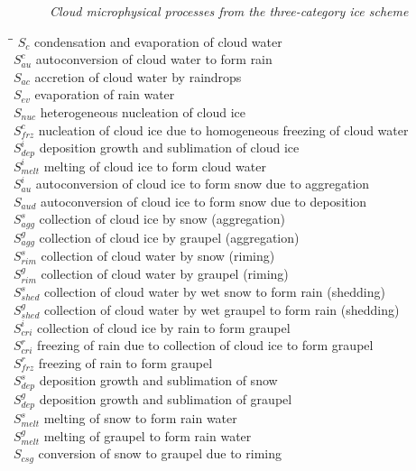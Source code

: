 \documentclass[a4paper,11pt]{article}
\begin{document}
\begin{figure}[h]
\centering
\epsfxsize 12.7cm
\centerline{}
\caption{\it Cloud microphysical processes from the three-category 
ice scheme} \label{scheme}
\end{figure}

\begin{tabbing}
\hspace*{0.5cm}\=\hspace{1.5cm}\= \kill
\> $S_c $ \> condensation and evaporation of cloud water\\
\> $S_{au}^c$ \> autoconversion of cloud water to form rain \\
\> $S_{ac}$ \> accretion of cloud water by raindrops \\
\> $S_{ev}$ \> evaporation of rain water \\
\> $S_{nuc}$ \> heterogeneous nucleation of cloud ice \\
\> $S_{frz}^c$ \> nucleation of cloud ice due to homogeneous freezing of
cloud water\\
\> $S_{dep}^i$ \> deposition growth and sublimation of cloud ice\\
\> $S_{melt}^i$ \> melting of cloud ice to form cloud water\\
\> $S_{au}^i$ \> autoconversion of cloud ice to form snow due to aggregation\\
\> $S_{aud}$ \> autoconversion of cloud ice to form snow due to deposition\\
\> $S_{agg}^s$ \> collection of cloud ice by snow (aggregation)\\
\> $S_{agg}^g$ \> collection of cloud ice by graupel (aggregation)\\
\> $S_{rim}^s$ \> collection of cloud water by snow (riming)\\
\> $S_{rim}^g$ \> collection of cloud water by graupel (riming)\\
\> $S_{shed}^s$ \> collection of cloud water by wet snow to form rain (shedding)\\
\> $S_{shed}^g$ \> collection of cloud water by wet graupel to form rain (shedding)\\
\> $S_{cri}^i$ \> collection of cloud ice by rain to form graupel\\
\> $S_{cri}^r$ \> freezing of rain due to collection of cloud ice to form graupel\\
\> $S_{frz}^r$ \> freezing of rain to form graupel\\
\> $S_{dep}^s$ \> deposition growth and sublimation of snow\\
\> $S_{dep}^g$ \> deposition growth and sublimation of graupel\\
\> $S_{melt}^s$ \> melting of snow to form rain water\\
\> $S_{melt}^g$ \> melting of graupel to form rain water\\
\> $S_{csg}$ \> conversion of snow to graupel due to riming\\
\end{tabbing}
\end{document}
